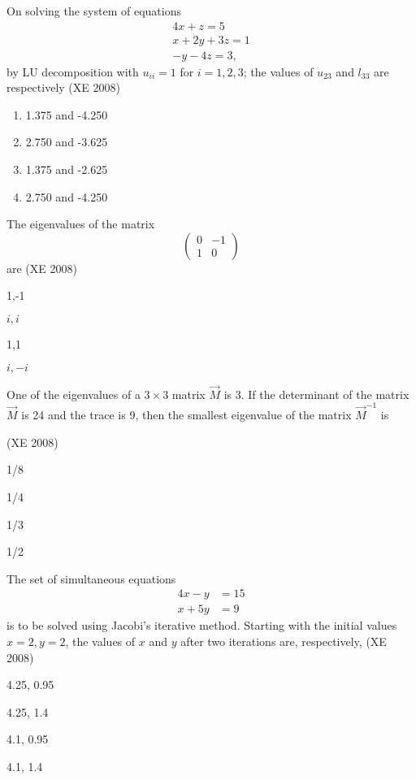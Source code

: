 \item  On solving the system of equations
\begin{align*}
4x+z =5\\
x+2y+3z =1\\
-y-4z=3,
\end{align*}
by LU decomposition with $u_{ii} =1$ for $i =1,2,3$; the values of $u_{23}$ and $l_{33}$ are respectively
\hfill (XE 2008)
\begin{enumerate}
\item  1.375 and -4.250
\item  2.750 and -3.625
\item  1.375 and -2.625
\item 2.750 and -4.250
\end{enumerate}


\item The eigenvalues of the matrix $$\begin{pmatrix}0&-1\\1&0\end{pmatrix}$$ are
\hfill (XE 2008)
\begin{enumerate}
\begin{multicols}{4}
\item 1,-1          
\item $i,i$
\item 1,1    
\item $i,-i$
\end{multicols}
\end{enumerate}

\item One of the eigenvalues of a $3\times 3$ matrix $\vec{M}$ is 3. If the determinant of the matrix $\vec{M}$ is 24 and the trace is 9, then the smallest eigenvalue of the matrix $\vec{M}^{-1}$ is

\hfill (XE 2008)
\begin{enumerate}
\begin{multicols}{4}
\item 1/8 
\item 1/4 
\item 1/3 
\item 1/2
\end{multicols}
\end{enumerate}
\item The set of simultaneous equations 
	\begin{align*}4x-y&=15 
		\\
x+5y&=9\end{align*} 
is to be solved using Jacobi's iterative method. Starting with the initial values $x = 2, y =2$, the values of $x$ and $y$ after two iterations are, respectively,
\hfill (XE 2008)
\begin{enumerate}
\begin{multicols}{4}
\item  4.25, 0.95
\item  4.25, 1.4
\item  4.1, 0.95
\item 4.1, 1.4
\end{multicols}
\end{enumerate}

